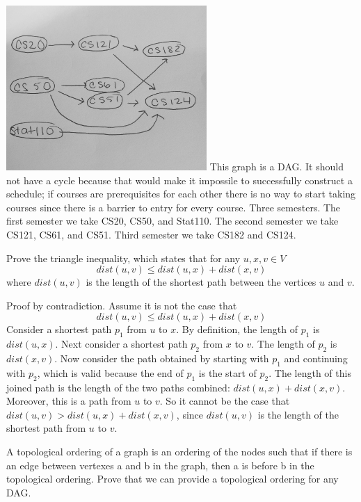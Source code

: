 \documentclass[solution, letterpaper]{cs20inclass}
\begin{document}
\begin{solution}
\subsolution \includegraphics[width=3in]{ClassGraph.jpg}
\subsolution This graph is a DAG. It should not have a cycle because that would make it impossile to successfully construct a schedule; if courses are prerequisites for each other there is no way to start taking courses since there is a barrier to entry for every course. 
\subsolution Three semesters. The first semester we take CS20, CS50, and Stat110. The second semester we take CS121, CS61, and CS51. Third semester we take CS182 and CS124. 


\end{solution}

\problem Prove the triangle inequality, which states that for any $u, x, v \in V$
\[dist(u, v) \le dist(u, x) + dist(x, v)\]
where $dist(u,v)$ is the length of the shortest path between the vertices $u$ and $v$.

\begin{solution}
Proof by contradiction. Assume it is not the case that \[dist(u, v) \le dist(u, x) + dist(x, v)\] Consider a shortest path $p_1$ from $u$ to $x$. By definition, the length of $p_1$ is $dist(u, x)$. Next consider a shortest path $p_2$ from $x$ to $v$. The length of $p_2$ is $dist(x, v)$. Now consider the path obtained by starting with $p_1$ and continuing with $p_2$, which is valid because the end of $p_1$ is the start of $p_2$. The length of this joined path is the length of the two paths combined: $dist(u, x)+dist(x, v)$. Moreover, this is a path from $u$ to $v$. So it cannot be the case that $dist(u, v) > dist(u, x)+dist(x, v)$, since $dist(u, v)$ is the length of the shortest path from $u$ to $v$.

\end{solution}

\problem [BONUS] A topological ordering of a graph is an ordering of the nodes such that if there is an edge between vertexes a and b in the graph, then a is before b in the topological ordering. Prove that we can provide a topological ordering for any DAG. 
\end{document}
